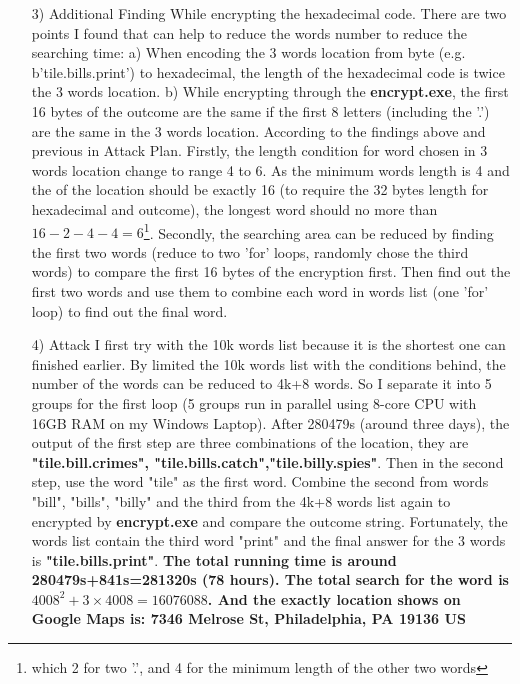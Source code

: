 \documentclass[11pt, a4paper, margin 2cm]{report}
\begin{document}
\begin{enumerate}
\normalsize\item[3)]{Additional Finding}
\newline\normalsize\indent\setlength{\parindent}{2em}While encrypting the hexadecimal code. There are two points I found that can help to reduce the words number to reduce the searching time: a) When encoding the 3 words location from byte (e.g. b'tile.bills.print') to hexadecimal, the length of the hexadecimal code is twice the 3 words location. b) While encrypting through the \textbf{encrypt.exe}, the first 16 bytes of the outcome are the same if the first 8 letters (including the '.') are the same in the 3 words location. \newline\normalsize\indent\setlength{\parindent}{2em}According to the findings above and previous in Attack Plan. Firstly, the length condition for word chosen in 3 words location change to range 4 to 6. As the minimum words length is 4 and the  of the location should be exactly 16 (to require the 32 bytes length for hexadecimal and outcome), the longest word should no more than $16-2-4-4=6$\footnote{which 2 for two '.', and 4 for the minimum length of the other two words}. Secondly, the searching area can be reduced by finding the first two words (reduce to two 'for' loops, randomly chose the third words) to compare the first 16 bytes of the encryption first. Then find out the first two words and use them to combine each word in words list (one 'for' loop) to find out the final word.

\normalsize\item[4)]{Attack}
\newline\normalsize\indent\setlength{\parindent}{2em}I first try with the 10k words list because it is the shortest one can finished earlier. By limited the 10k words list with the conditions behind, the number of the words can be reduced to 4k+8 words. So I separate it into 5 groups for the first loop (5 groups run in parallel using 8-core CPU with 16GB RAM on my Windows Laptop). After 280479s (around three days), the output of the first step are three combinations of the location, they are \textbf{"tile.bill.crimes", "tile.bills.catch","tile.billy.spies"}. \newline Then in the second step, use the word "tile" as the first word. Combine the second from words "bill", "bills", "billy" and the third from the 4k+8 words list again to encrypted by \textbf{encrypt.exe} and compare the outcome string. Fortunately, the words list contain the third word "print" and the final answer for the 3 words is \textbf{"tile.bills.print"}.
\newline\textbf{The total running time is around 280479s+841s=281320s (78 hours). The total search for the word is $4008^2+3\times4008=16076088$. And the exactly location shows on Google Maps is: 7346 Melrose St, Philadelphia, PA 19136 US}
\end{enumerate}
\end{document}
